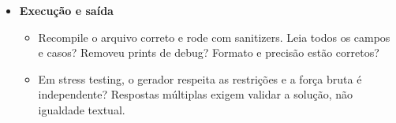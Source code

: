 \begin{itemize}[leftmargin=*,label={}]
\item \ifextended\else\begin{minipage}[t]{\linewidth}\fi\textbf{Execução e saída}
\begin{itemize}[leftmargin=*,label={\(\square\)}]
\item Recompile o arquivo correto e rode com sanitizers. Leia todos os campos e casos? Removeu prints de debug? Formato e precisão estão corretos?
\item Em stress testing, o gerador respeita as restrições e a força bruta é independente? Respostas múltiplas exigem validar a solução, não igualdade textual.
\end{itemize}
\ifextended\else\end{minipage}\fi
\end{itemize}

